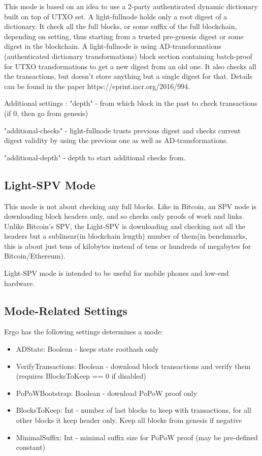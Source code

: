 \documentclass[]{report}   %
\begin{document}
This mode is based on an idea to use a 2-party authenticated dynamic dictionary built on top of
UTXO set. A light-fullnode holds only a root digest of a dictionary. It check all the full blocks, or some
suffix of the full blockchain, depending on setting, thus starting from a trusted pre-genesis digest or some digest in 
the blockchain. A light-fullnode is using AD-transformations (authenticated dictionary transformations) block section
containing batch-proof for UTXO transformations to get a new digest from an old one. It also checks all the transactions, 
but doesn't store anything but a single digest for that. Details can be found in the paper 
https://eprint.iacr.org/2016/994.

Additional settings : "depth" - from which block in the past to check transactions (if 0, then go from genesis)

"additional-checks" - %
light-fullnode trusts previous digest and checks current digest validity by using the previous one as well
 as AD-transformations.
 
"additional-depth" - depth to start additional checks from.  

\subsection{Light-SPV Mode}
\label{sec:light-spv}


This mode is not about checking any full blocks. Like in Bitcoin, an SPV node is downloading block headers only,
and so checks only proofs of work and links. Unlike Bitcoin's SPV, the Light-SPV is downloading
 and checking not all the headers but a sublinear(in blockchain length) number of them(in benchmarks, this is about just
 tens of kilobytes instead of tens or hundreds of megabytes for Bitcoin/Ethereum).
 
Light-SPV mode is intended to be useful for mobile phones and low-end hardware. 

\subsection{Mode-Related Settings}

Ergo has the following settings determines a mode:
\begin{itemize}
  \item{ADState: Boolean} - keeps state roothash only 
  \item{VerifyTransactions: Boolean} - download block transactions and verify them (requires BlocksToKeep == 0 if disabled)
  \item{PoPoWBootstrap: Boolean} - download PoPoW proof only
  \item{BlocksToKeep: Int} - number of last blocks to keep with transactions, for all other blocks it keep header only. Keep all blocks from genesis if negative
  \item{MinimalSuffix: Int} - minimal suffix size for PoPoW proof (may be pre-defined constant)
\end{itemize}
\end{document}
